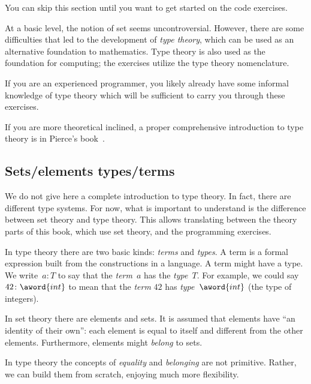 
\begin{remark}
    You can skip this section until you want to get started on the code exercises.
\end{remark}

At a basic level, the notion of set seems uncontroversial.
However, there are some difficulties that led to the development of \emph{type theory},
which can be used as an alternative foundation to mathematics.
Type theory is also used as the foundation for computing; the exercises utilize the type theory nomenclature.

If you are an experienced programmer, you likely already have some informal knowledge of type theory which will be sufficient to carry you through these exercises.


If you are more theoretical inclined, a proper comprehensive introduction to type theory is in Pierce's book~\cite{pierce02types}.

\subsection{Sets/elements \vs types/terms}
We do not give here a complete introduction to type theory.
In fact, there are different type systems.
For now, what is important to understand is the difference between set theory and type theory.
This allows translating between the theory parts of this book, which use set theory, and the programming exercises.

In type theory there are two basic kinds: \emph{terms} and \emph{types}.
A term is a formal expression built from the constructions in a language.
A term might have a type.
We write~$a \colon T$ to say that the \emph{term}~$a$ has the \emph{type}~$T$.
For example, we could say~$42 \colon \aword{int}$ to mean that the \emph{term}  $42$ has \emph{type}~$\aword{int}$ (the type of integers).

In set theory there are elements and sets.
It is assumed that elements have ``an identity of their own'': each element is equal to itself and different from the other elements.
Furthermore, elements might \emph{belong} to sets.

In type theory the concepts of \emph{equality} and \emph{belonging} are not primitive.
Rather, we can build them from scratch, enjoying much more flexibility.

